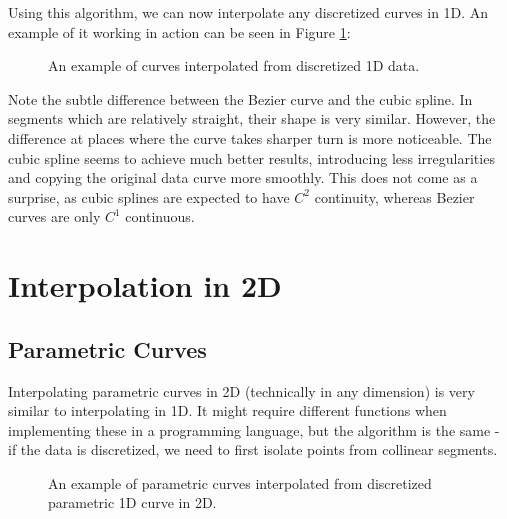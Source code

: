 \documentclass[a4paper,10pt]{report}
\begin{document}
Using this algorithm, we can now interpolate any discretized curves in 1D. An example of it working in action can be seen in Figure \ref{fig:1D_fun_interpolated}:
\begin{figure}[H]
    \centering
    \begin{subfigure}{0.6\textwidth}
        
    \end{subfigure}
    \hfill
    \begin{subfigure}{0.39\textwidth}
        
    \end{subfigure}
    \caption{An example of curves interpolated from discretized 1D data.}
    \label{fig:1D_fun_interpolated}
\end{figure}

Note the subtle difference between the Bezier curve and the cubic spline. In segments which are relatively straight, their shape is very similar. However, the difference at places where the curve takes sharper turn is more noticeable. The cubic spline seems to achieve much better results, introducing less irregularities and copying the original data curve more smoothly. This does not come as a surprise, as cubic splines are expected to have \textit{$C^2$} continuity, whereas Bezier curves are only \textit{$C^1$} continuous.

\chapter{Interpolation in 2D}
\section{Parametric Curves}\label{sec:param_curve}
Interpolating parametric curves in 2D (technically in any dimension) is very similar to interpolating in 1D. It might require different functions when implementing these in a programming language, but the algorithm is the same - if the data is discretized, we need to first isolate points from collinear segments.
\begin{figure}[H]
    \centering
    \begin{subfigure}{0.49\textwidth}
        
    \end{subfigure}
    \hfill
    \begin{subfigure}{0.49\textwidth}
        
    \end{subfigure}
    \caption{An example of parametric curves interpolated from discretized parametric 1D curve in 2D.}
    \label{fig:2D_parametric_curve}
\end{figure}
\end{document}
